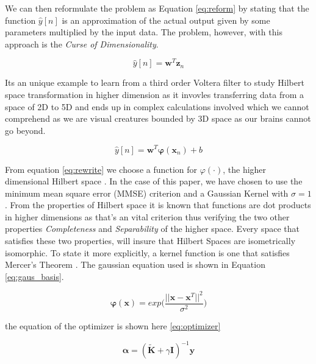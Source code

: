 \documentclass[conference]{IEEEtran}
\begin{document}
We can then reformulate the problem as Equation \ref{eq:reform} by stating that the function $\hat{y}[n]$ is an approximation of the actual output
given by some parameters multiplied by the input data. The problem, however, with this approach is the \textit{Curse of Dimensionality}.

\begin{equation}
\hat{y}[n] = \mathbf{w}^T\mathbf{z}_n
\label{eq:reform}
\end{equation}

Its an unique example to learn from a third order Voltera filter to study Hilbert space transformation in higher dimension as it invovles transferring data from a space of 2D to 5D and ends up in complex calculations involved which we cannot comprehend as we are visual creatures bounded by 3D space as our brains cannot go beyond.
  
 \begin{equation}
\hat{y}[n] = \mathbf{w}^T\mathbf{\varphi}(\mathbf{x}_n) + b
\label{eq:rewrite}
\end{equation}

From equation \ref{eq:rewrite} we choose a function for $\varphi(\cdot)$, the higher dimensional Hilbert space \cite{kernelmethods}. In 
the case of this paper, we have chosen to use the minimum mean square error (MMSE) criterion and a Gaussian Kernel with $\sigma = 1$. From the properties of Hilbert space it is known that functions are dot products in higher dimensions as that's an vital criterion thus verifying the two other properties \textit{Completeness} and \textit{Separability} of the higher space. Every space that satisfies these two properties, will insure that Hilbert Spaces are isometrically isomorphic. To state it more explicitly, a kernel function is one that satisfies Mercer's Theorem \cite{kernelmethods}. The gaussian equation 
used is shown in Equation \ref{eq:gaus_basis}.

\begin{equation}
\mathbf{\varphi(x)} = exp\bigg(\frac{||\mathbf{x} - \mathbf{x}^T||^2}{\sigma^2}\bigg)
\label{eq:gaus_basis}
\end{equation}

the equation of the optimizer is shown here \ref{eq:optimizer} 

\begin{equation}
\mathbf{\alpha} = (\mathbf{\widetilde{K}} + \gamma \mathbf{I})^{-1}\mathbf{y}
\label{eq:optimizer}
\end{equation}
\end{document}
